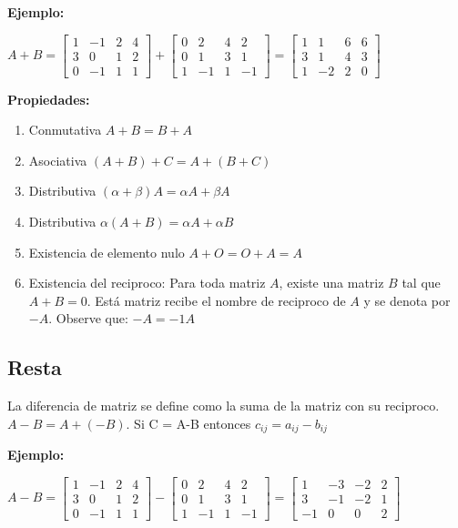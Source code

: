 \textbf{Ejemplo:}

$A +B =\begin{bmatrix} 1 & -1 & 2 & 4 \\ 3 & 0 & 1 & 2 \\ 0 & -1 & 1 & 1 \end{bmatrix} + \begin{bmatrix} 0 & 2 & 4 & 2 \\ 0 & 1 & 3 & 1 \\ 1 & -1 & 1 & -1 \end{bmatrix} = \begin{bmatrix} 1 & 1 & 6 & 6 \\ 3 & 1 & 4 & 3 \\ 1 & -2 & 2 & 0 \end{bmatrix} $

\textbf{Propiedades:}

\begin{enumerate}
	\item Conmutativa $A+B=B+A$
	\item Asociativa $(A+B)+C=A+(B+C)$
	\item Distributiva $(\alpha+\beta)A=\alpha A + \beta A$
	\item Distributiva $\alpha(A+B)=\alpha A + \alpha B$
	\item Existencia de elemento nulo $A+O=O+A=A$
	\item Existencia del reciproco: Para toda matriz $A$, existe una matriz $B$ tal que $A+B=0$. Está matriz recibe el nombre de reciproco de $A$ y se denota por $-A$. Observe que: $-A=-1A$
\end{enumerate}

\subsection{Resta}

La diferencia de matriz se define como la suma de la matriz con su reciproco. $A-B = A + (-B)$. Si C = A-B entonces $c_{ij} = a_{ij} - b_{ij}$

\textbf{Ejemplo:}

$A - B =\begin{bmatrix} 1 & -1 & 2 & 4 \\ 3 & 0 & 1 & 2 \\ 0 & -1 & 1 & 1 \end{bmatrix} - \begin{bmatrix} 0 & 2 & 4 & 2 \\ 0 & 1 & 3 & 1 \\ 1 & -1 & 1 & -1 \end{bmatrix} = \begin{bmatrix} 1 & -3 & -2 & 2 \\ 3 & -1 & -2 & 1 \\ -1 & 0 & 0 & 2 \end{bmatrix} $

